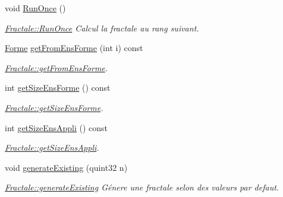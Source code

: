 \begin{DoxyCompactItemize}
void \hyperlink{class_fractale_a27cf7a947501a5a7afe3afa893c0b9d2}{Run\+Once} ()
\begin{DoxyCompactList}\small\item\em \hyperlink{class_fractale_a27cf7a947501a5a7afe3afa893c0b9d2}{Fractale\+::\+Run\+Once} Calcul la fractale au rang suivant. \end{DoxyCompactList}\item 
\hyperlink{class_forme}{Forme} \hyperlink{class_fractale_a4507964af35193bf4704aac4c3206c62}{get\+From\+Ens\+Forme} (int i) const 
\begin{DoxyCompactList}\small\item\em \hyperlink{class_fractale_a4507964af35193bf4704aac4c3206c62}{Fractale\+::get\+From\+Ens\+Forme}. \end{DoxyCompactList}\item 
int \hyperlink{class_fractale_a1a95e10996abd82855d68e1ef26eee9c}{get\+Size\+Ens\+Forme} () const 
\begin{DoxyCompactList}\small\item\em \hyperlink{class_fractale_a1a95e10996abd82855d68e1ef26eee9c}{Fractale\+::get\+Size\+Ens\+Forme}. \end{DoxyCompactList}\item 
int \hyperlink{class_fractale_aebd8ba372ee13067816e8335f0ad0b06}{get\+Size\+Ens\+Appli} () const 
\begin{DoxyCompactList}\small\item\em \hyperlink{class_fractale_aebd8ba372ee13067816e8335f0ad0b06}{Fractale\+::get\+Size\+Ens\+Appli}. \end{DoxyCompactList}\item 
void \hyperlink{class_fractale_a9394c7048ef36aedbe33ef2607c40155}{generate\+Existing} (quint32 n)
\begin{DoxyCompactList}\small\item\em \hyperlink{class_fractale_a9394c7048ef36aedbe33ef2607c40155}{Fractale\+::generate\+Existing} Génere une fractale selon des valeurs par defaut. \end{DoxyCompactList}\end{DoxyCompactItemize}

